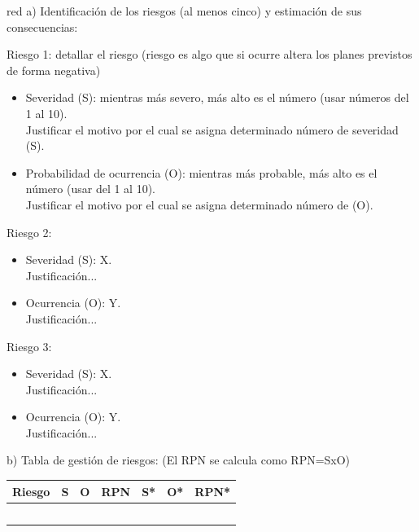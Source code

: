 \documentclass[
11pt, %
]{charter}
\begin{document}
\begin{consigna}{red}
a) Identificación de los riesgos (al menos cinco) y estimación de sus consecuencias:
 
Riesgo 1: detallar el riesgo (riesgo es algo que si ocurre altera los planes previstos de forma negativa)
\begin{itemize}
	\item Severidad (S): mientras más severo, más alto es el número (usar números del 1 al 10).\\
	Justificar el motivo por el cual se asigna determinado número de severidad (S).
	\item Probabilidad de ocurrencia (O): mientras más probable, más alto es el número (usar del 1 al 10).\\
	Justificar el motivo por el cual se asigna determinado número de (O). 
\end{itemize}   

Riesgo 2:
\begin{itemize}
	\item Severidad (S): X.\\
	Justificación...
	\item Ocurrencia (O): Y.\\
	Justificación...
\end{itemize}

Riesgo 3:
\begin{itemize}
	\item Severidad (S):  X.\\
	Justificación...
	\item Ocurrencia (O): Y.\\
	Justificación...
\end{itemize}


b) Tabla de gestión de riesgos:      (El RPN se calcula como RPN=SxO)

\begin{table}[htpb]
\centering
\begin{tabularx}{\linewidth}{@{}|X|c|c|c|c|c|c|@{}}
\hline
\rowcolor[HTML]{C0C0C0} 
Riesgo & S & O & RPN & S* & O* & RPN* \\ \hline
       &   &   &     &    &    &      \\ \hline
       &   &   &     &    &    &      \\ \hline
       &   &   &     &    &    &      \\ \hline
       &   &   &     &    &    &      \\ \hline
       &   &   &     &    &    &      \\ \hline
\end{tabularx}%
\end{table}


\end{consigna}
\end{document}

